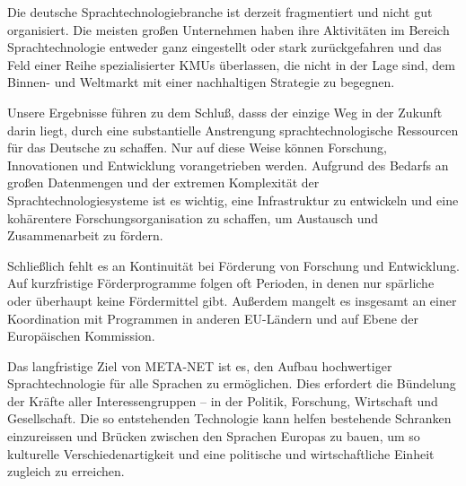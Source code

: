\documentclass[]{../../metanetpaper}
\begin{document}
\begin{Parallel}[c]{79mm}{78mm}
{Die deutsche Sprachtechnologiebranche  ist derzeit fragmentiert und nicht gut organisiert. Die meisten großen Unternehmen haben ihre Aktivitäten im Bereich Sprachtechnologie entweder ganz eingestellt oder stark zurückgefahren und das Feld einer Reihe spezialisierter KMUs überlassen, die nicht in der Lage sind, dem Binnen- und Weltmarkt mit einer nachhaltigen Strategie zu begegnen. 

Unsere Ergebnisse führen zu dem Schluß, dasss der einzige Weg in der Zukunft darin liegt, durch eine substantielle Anstrengung sprachtechnologische Ressourcen für das Deutsche zu schaffen. Nur auf diese Weise können Forschung, Innovationen und Entwicklung vorangetrieben werden. Aufgrund des Bedarfs an großen Datenmengen und der extremen Komplexität der Sprachtechnologiesysteme ist es wichtig, eine Infrastruktur zu entwickeln und eine kohärentere Forschungsorganisation zu schaffen, um Austausch und Zusammenarbeit zu fördern.

Schließlich fehlt es an Kontinuität bei Förderung von Forschung und Entwicklung. Auf kurzfristige Förderprogramme folgen oft Perioden, in denen nur spärliche oder überhaupt keine Fördermittel gibt. Außerdem mangelt es insgesamt an einer Koordination mit Programmen in anderen EU-Ländern und auf Ebene der Europäischen Kommission.

Das langfristige Ziel von META-NET ist es, den Aufbau hochwertiger Sprachtechnologie für alle Sprachen zu ermöglichen. Dies erfordert die Bündelung der Kräfte aller Interessengruppen – in der Politik, Forschung, Wirtschaft und Gesellschaft. Die so entstehenden Technologie kann helfen bestehende Schranken einzureissen und Brücken zwischen den Sprachen Europas zu bauen, um so kulturelle Verschiedenartigkeit und eine politische und wirtschaftliche Einheit zugleich zu erreichen. 
  }

\end{Parallel}
\end{document}

